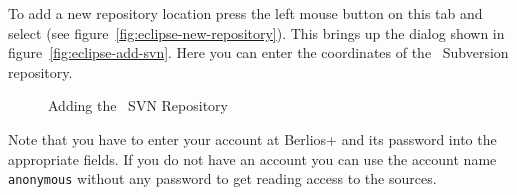 To add a new repository location press the left mouse button on this
tab and select  (see
figure~\ref{fig:eclipse-new-repository}). This brings up the dialog
shown in figure~\ref{fig:eclipse-add-svn}. Here you can enter the
coordinates of the \ExTeX\ Subversion repository.
\begin{figure}[ht]
  \hbox{}\hfill
  \hfill
  \caption{Adding the \ExTeX\ SVN Repository}
\end{figure}

Note that you have to enter your account at \+Berlios+ and its
password into the appropriate fields. If you do not have an account
you can use the account name \texttt{anonymous} without any password
to get reading access to the sources.

